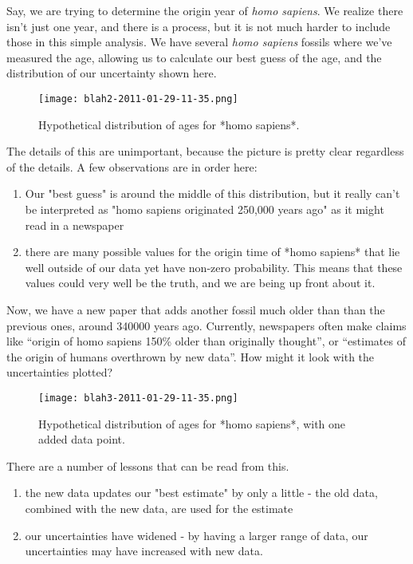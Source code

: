 \documentclass{tufte-book}
\begin{document}
Say, we are trying to determine the origin year of \emph{homo sapiens}.
We realize there isn't just one year, and there is a process, but it is
not much harder to include those in this simple analysis. We have
several \emph{homo sapiens} fossils where we've measured the age,
allowing us to calculate our best guess of the age, and the distribution
of our uncertainty shown here.

\begin{figure}[htbp]
\centering
\texttt{[image: blah2-2011-01-29-11-35.png]}
\caption{Hypothetical distribution of ages for *homo sapiens*.}
\end{figure}

The details of this are unimportant, because the picture is pretty clear
regardless of the details. A few observations are in order here:

\begin{enumerate}
\def\labelenumi{\arabic{enumi}.}
\itemsep1pt\parskip0pt
\item
  Our "best guess" is around the middle of this distribution, but it
  really can't be interpreted as "homo sapiens originated 250,000 years
  ago" as it might read in a newspaper
\item
  there are many possible values for the origin time of *homo sapiens* that lie well outside of our data yet have non-zero probability.  This means that these values could very well be the truth, and we are being up front about it.
\end{enumerate}

Now, we have a new paper that adds another fossil much older than than
the previous ones, around 340000 years ago. Currently, newspapers often
make claims like ``origin of homo sapiens 150\% older than originally
thought'', or ``estimates of the origin of humans overthrown by new
data''. How might it look with the uncertainties plotted?

\begin{figure}[htbp]
\centering
\texttt{[image: blah3-2011-01-29-11-35.png]}
\caption{Hypothetical distribution of ages for *homo sapiens*, with one added data point.}
\end{figure}

There are a number of lessons that can be read from this.

\begin{enumerate}
\def\labelenumi{\arabic{enumi}.}
\itemsep1pt\parskip0pt
\item
  the new data updates our "best estimate" by only a little - the old
  data, combined with the new data, are used for the estimate
\item
  our uncertainties have widened - by having a larger range of data, our
  uncertainties may have increased with new data.
\end{enumerate}
\end{document}
